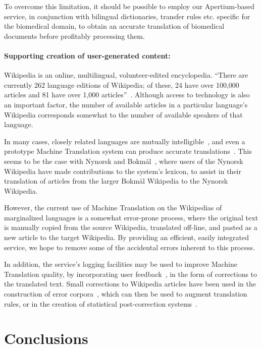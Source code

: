 \documentclass[11pt]{article}
\begin{document}
To overcome this limitation, it should be possible to employ our Apertium-based service, in conjunction with bilingual dictionaries, transfer rules etc. specific for the biomedical domain, to obtain an accurate translation of biomedical documents before profitably processing them.

\paragraph{Supporting creation of user-generated content:} Wikipedia is an online, multilingual, volunteer-edited encyclopedia. ``There are currently 262 language editions of Wikipedia; of these, 24 have over 100,000 articles and 81 have over 1,000 articles''~\citep{wikipedia}. Although access to technology is also an important factor, the number of available articles in a particular language's Wikipedia corresponds somewhat to the number of available speakers of that language.

In many cases, closely related languages are mutually intelligible~\citep{tyers09a}, and even a prototype Machine Translation system can produce accurate translations~\citep{oller06}. This seems to be the case with Nynorsk and Bokmål~\citep{unhammer09}, where users of the Nynorsk Wikipedia have made contributions to the system's lexicon, to assist in their translation of articles from the larger Bokmål Wikipedia to the Nynorsk Wikipedia.

However, the current use of Machine Translation on the Wikipedias of marginalized languages is a somewhat error-prone process, where the original text is manually copied from the source Wikipedia, translated off-line, and pasted as a new article to the target Wikipedia. By providing an efficient, easily integrated service, we hope to remove some of the accidental errors inherent to this process.

In addition, the service's logging facilities may be used to improve Machine Translation quality, by incorporating user feedback~\citep{google}, in the form of corrections to the translated text. Small corrections to Wikipedia articles have been used in the construction of error corpora~\citep{milek08}, which can then be used to augment translation rules, or in the creation of statistical post-correction systems~\citep{dugast07}.

\section{Conclusions}
\end{document}
